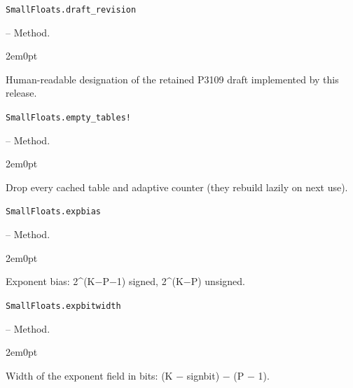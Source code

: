 \par\medskip\noindent\begin{minipage}{\linewidth}
\hypertarget{12251047644429871338}{\texttt{SmallFloats.draft\_\allowbreak{}revision}}  -- {Method.}
\nopagebreak
\begin{adjustwidth}{2em}{0pt}

Human-readable designation of the retained P3109 draft implemented by this release.



\end{adjustwidth}
\end{minipage}
\par\medskip

\par\medskip\noindent\begin{minipage}{\linewidth}
\hypertarget{11642396758074844399}{\texttt{SmallFloats.empty\_\allowbreak{}tables!}}  -- {Method.}
\nopagebreak
\begin{adjustwidth}{2em}{0pt}

Drop every cached table and adaptive counter (they rebuild lazily on next use).



\end{adjustwidth}
\end{minipage}
\par\medskip

\par\medskip\noindent\begin{minipage}{\linewidth}
\hypertarget{16181201817687362672}{\texttt{SmallFloats.expbias}}  -- {Method.}
\nopagebreak
\begin{adjustwidth}{2em}{0pt}

Exponent bias: 2{\textasciicircum}(K−P−1) signed, 2{\textasciicircum}(K−P) unsigned.



\end{adjustwidth}
\end{minipage}
\par\medskip

\par\medskip\noindent\begin{minipage}{\linewidth}
\hypertarget{4256747445410702613}{\texttt{SmallFloats.expbitwidth}}  -- {Method.}
\nopagebreak
\begin{adjustwidth}{2em}{0pt}

Width of the exponent field in bits: (K − signbit) − (P − 1).



\end{adjustwidth}
\end{minipage}
\par\medskip

